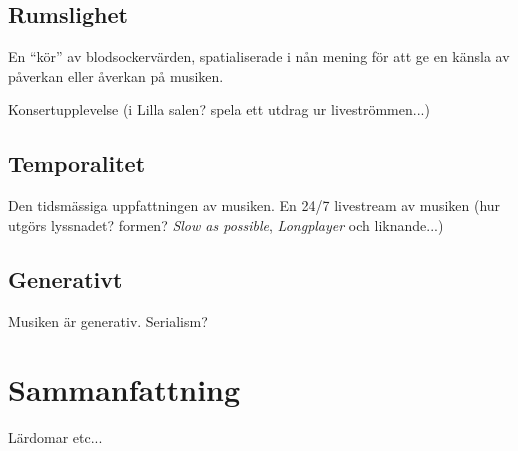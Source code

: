 \documentclass[11pt, twoside, a4paper]{article}
\begin{document}
\subsection{Rumslighet}
En \enquote{kör} av blodsockervärden, spatialiserade i nån mening för att ge en känsla av påverkan eller åverkan på musiken. 

Konsertupplevelse (i Lilla salen? spela ett utdrag ur liveströmmen...)

\subsection{Temporalitet}
Den tidsmässiga uppfattningen av musiken. En 24/7 livestream av musiken (hur utgörs lyssnadet? formen? \emph{Slow as possible}, \emph{Longplayer} och liknande...)

\subsection{Generativt}
Musiken är generativ. Serialism?

\section{Sammanfattning}
Lärdomar etc...

\newpage



\end{document}

